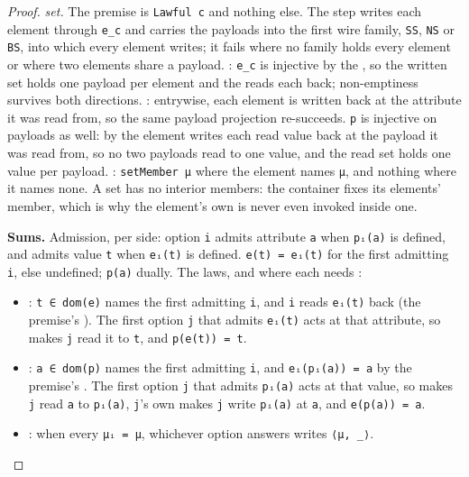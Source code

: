 \begin{proof}
\emph{set.} The premise is \texttt{Lawful\ c} and nothing else. The step writes each element through \texttt{e\_c} and
carries the payloads into the first wire family, \texttt{SS}, \texttt{NS} or \texttt{BS}, into which every element writes; it
fails where no family holds every element or where two elements share a payload. : \texttt{e\_c} is
injective by the , so the written set holds one payload per element and the  reads
each back; non-emptiness survives both directions. : entrywise, each element is
written back at the attribute it was read from, so the same payload projection re-succeeds. \texttt{p} is injective on payloads as well: by  the element writes each read value back at the payload it was read from, so no two payloads read to one value, and the read set holds one value per payload. : \texttt{setMember\ μ} where the element names \texttt{μ}, and nothing where it names none. A set
has no interior members: the container fixes its elements' member, which is why the element's own
 is never even invoked inside one.

\textbf{Sums.} Admission, per side: option \texttt{i} admits attribute \texttt{a} when \texttt{pᵢ(a)} is defined, and admits
value \texttt{t} when \texttt{eᵢ(t)} is defined. \texttt{e(t)\ =\ eᵢ(t)} for the first admitting \texttt{i}, else undefined;
\texttt{p(a)} dually. The laws, and where each needs :

\begin{itemize}
\tightlist
\item
  : \texttt{t\ ∈\ dom(e)} names the first admitting \texttt{i}, and \texttt{i} reads \texttt{eᵢ(t)} back (the
  premise's ). The first option \texttt{j} that admits \texttt{eᵢ(t)} acts at that attribute, so
   makes \texttt{j} read it to \texttt{t}, and \texttt{p(e(t))\ =\ t}.
\item
  : \texttt{a\ ∈\ dom(p)} names the first admitting \texttt{i}, and \texttt{eᵢ(pᵢ(a))\ =\ a} by the premise's
  . The first option \texttt{j} that admits \texttt{pᵢ(a)} acts at that value, so
   makes \texttt{j} read \texttt{a} to \texttt{pᵢ(a)}, \texttt{j}'s own  makes \texttt{j}
  write \texttt{pᵢ(a)} at \texttt{a}, and \texttt{e(p(a))\ =\ a}.
\item
  : when every \texttt{μᵢ\ =\ μ}, whichever option answers writes \texttt{⟨μ,\ \_⟩}.
\end{itemize}


\end{proof}
